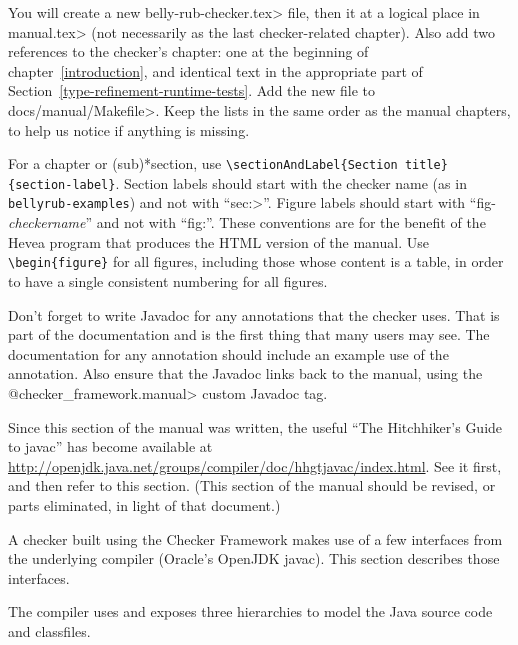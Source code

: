 You will create a new \<belly-rub-checker.tex> file,
then \verb|| it at a logical place in \<manual.tex> (not
necessarily as the last checker-related chapter).  Also add two references
to the checker's chapter:  one at the beginning of
chapter~\ref{introduction}, and identical text in the appropriate part of
Section~\ref{type-refinement-runtime-tests}.  Add the new file to
\<docs/manual/Makefile>.  Keep the lists in
the same order as the manual chapters, to help us notice if anything is
missing.

For a chapter or (sub)*section, use \verb|\sectionAndLabel{Section title}{section-label}|.
Section labels should start with the checker
name (as in \verb|bellyrub-examples|) and not with ``\<sec:>''.
Figure labels should start with ``fig-\emph{checkername}'' and not with ``fig:''.
These conventions are for the benefit of the Hevea program that produces
the HTML version of the manual.
Use \verb|\begin{figure}| for all figures, including those whose
content is a table, in order to have a single consistent numbering for all
figures.

Don't forget to write Javadoc for any annotations that the checker uses.
That is part of the documentation and is the first thing that many users
may see.  The documentation for any annotation should include an example
use of the annotation.
Also ensure that the Javadoc links back to the manual, using the
\<@checker\_framework.manual> custom Javadoc tag.



Since this section of the manual was written, the useful ``The Hitchhiker's
Guide to javac'' has become available at
\url{http://openjdk.java.net/groups/compiler/doc/hhgtjavac/index.html}.
See it first, and then refer to this section.  (This section of the manual
should be revised, or parts eliminated, in light of that document.)


A checker built using the Checker Framework makes use of a few interfaces
from the underlying compiler (Oracle's OpenJDK javac).
This section describes those interfaces.





The compiler uses and exposes three hierarchies to model the Java
source code and classfiles.



